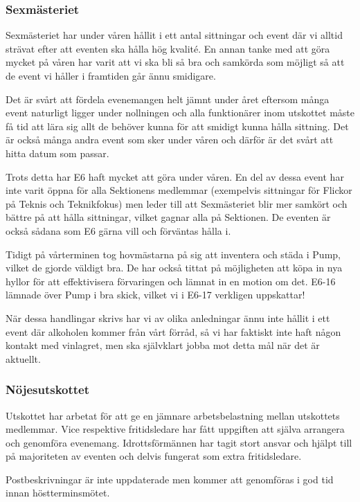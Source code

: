 \documentclass[../_main/handlingar.tex]{subfiles}
\begin{document}
\subsubsection*{Sexmästeriet}
Sexmästeriet har under våren hållit i ett antal sittningar och event där vi alltid strävat efter att eventen ska hålla hög kvalité. En annan tanke med att göra mycket på våren har varit att vi ska bli så bra och samkörda som möjligt så att de event vi håller i framtiden går ännu smidigare.

Det är svårt att fördela evenemangen helt jämnt under året eftersom många event naturligt ligger under nollningen och alla funktionärer inom utskottet måste få tid att lära sig allt de behöver kunna för att smidigt kunna hålla sittning. Det är också många andra event som sker under våren och därför är det svårt att hitta datum som passar.

Trots detta har E6 haft mycket att göra under våren. En del av dessa event har inte varit öppna för alla Sektionens medlemmar (exempelvis sittningar för Flickor på Teknis och Teknikfokus) men leder till att Sexmästeriet blir mer samkört och bättre på att hålla sittningar, vilket gagnar alla på Sektionen. De eventen är också sådana som E6 gärna vill och förväntas hålla i.

Tidigt på vårterminen tog hovmästarna på sig att inventera och städa i Pump, vilket de gjorde väldigt bra. De har också tittat på möjligheten att köpa in nya hyllor för att effektivisera förvaringen och lämnat in en motion om det. E6-16 lämnade över Pump i bra skick, vilket vi i E6-17 verkligen uppskattar!

När dessa handlingar skrivs har vi av olika anledningar ännu inte hållit i ett event där alkoholen kommer från vårt förråd, så vi har faktiskt inte haft någon kontakt med vinlagret, men ska självklart jobba mot detta mål när det är aktuellt.

\subsubsection*{Nöjesutskottet}
Utskottet har arbetat för att ge en jämnare arbetsbelastning mellan utskottets medlemmar. Vice respektive fritidsledare har fått uppgiften att själva arrangera och genomföra evenemang. Idrottsförmännen har tagit stort ansvar och hjälpt till på majoriteten av eventen och delvis fungerat som extra fritidsledare.

Postbeskrivningar är inte uppdaterade men kommer att genomföras i god tid innan höstterminsmötet.
\end{document}
